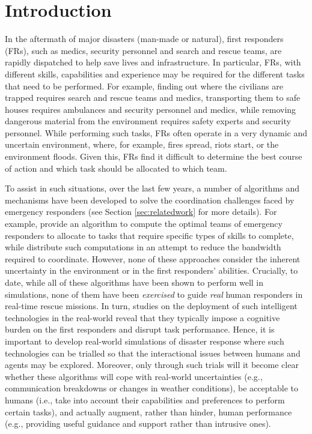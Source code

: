 \section{Introduction}
In the aftermath of major disasters (man-made or natural), first responders  (FRs), such as medics, security personnel and search and rescue teams, are  rapidly dispatched to help save lives and infrastructure. In particular, FRs, with different skills, capabilities and experience may be required for the different tasks that need to be performed.  For example, finding out where the civilians are  trapped requires search and rescue teams and medics, transporting them to safe houses  requires ambulances and security personnel and medics, while  removing dangerous material from the environment requires safety experts and security personnel. While performing such tasks, FRs often operate in a very dynamic and uncertain environment, where, for example, fires  spread, riots start, or the environment floods. Given this, FRs find it difficult to determine the best course of action and which task should be allocated to which team.

To assist in such situations, over the last few years, a number of  algorithms  and mechanisms have been developed to solve the coordination challenges faced by emergency responders  (see Section \ref{sec:relatedwork} for more details). For example, \cite{ramchurn:etal:2010} provide an algorithm to compute the optimal teams of emergency responders to allocate to tasks that require specific types of skills to complete, while \cite{Chapman2009,puyol:etal:2014} distribute such computations in an attempt to reduce the bandwidth required to coordinate. However, none of these approaches consider the inherent uncertainty in the environment or in the first responders' abilities. Crucially, to date, while all of these algorithms have been shown to perform well in simulations, none of them have been \emph{exercised} to guide \emph{real} human responders in real-time rescue missions. In turn,  studies on the deployment of such intelligent technologies in the real-world reveal that they typically impose a cognitive burden on the first responders \cite{Rachlin1997,Moran2013} and disrupt task performance.  Hence, it is important to develop real-world simulations of disaster response where such technologies can be trialled so that  the interactional issues between humans and agents may be explored. Moreover, only through such trials will it become clear whether these algorithms will cope with real-world uncertainties (e.g., communication breakdowns or changes in weather conditions), be acceptable to humans (i.e., take into account their capabilities and preferences to perform certain tasks), and actually augment, rather than hinder,  human performance (e.g., providing useful guidance and support rather than intrusive ones). 


